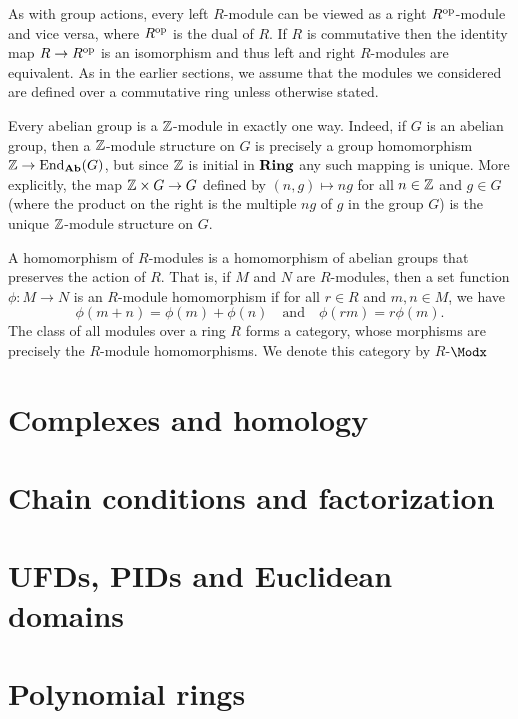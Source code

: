 As with group actions, every left \(R\)-module can be viewed as a right \(R^{\mathrm{op}}\)-module and vice versa, where \(R^{\mathrm{op}}\) is the dual of \(R\). If \(R\) is commutative then the identity map \(R \to R^{\mathrm{op}}\) is an isomorphism and thus left and right \(R\)-modules are equivalent. As in the earlier sections, we assume that the modules we considered are defined over a commutative ring unless otherwise stated.

\begin{example}
    Every abelian group is a \(\mathbb{Z}\)-module in exactly one way. Indeed, if \(G\) is an abelian group, then a \(\mathbb{Z}\)-module structure on \(G\) is precisely a group homomorphism \(\mathbb{Z} \to \operatorname{End}_{\mathbf{Ab}}(G)\), but since \(\mathbb{Z}\) is initial in \(\mathbf{Ring}\) any such mapping is unique. More explicitly, the map \(\mathbb{Z} \times G \to G\) defined by \((n, g) \mapsto ng\) for all \(n \in \mathbb{Z}\) and \(g \in G\) (where the product on the right is the multiple \(ng\) of \(g\) in the group \(G\)) is the unique \(\mathbb{Z}\)-module structure on \(G\).
\end{example}

A homomorphism of \(R\)-modules is a homomorphism of abelian groups that preserves the action of \(R\). That is, if \(M\) and \(N\) are \(R\)-modules, then a set function \(\phi: M \to N\) is an \(R\)-module homomorphism if for all \(r \in R\) and \(m, n \in M\), we have
\[
    \phi(m + n) = \phi(m) + \phi(n) \quad \text{and} \quad \phi(rm) = r\phi(m).
\]
The class of all modules over a ring \(R\) forms a category, whose morphisms are precisely the \(R\)-module homomorphisms. We denote this category by \(R\)-\(\Modx\)

\section{Complexes and homology}

\section{Chain conditions and factorization}

\section{UFDs, PIDs and Euclidean domains}

\section{Polynomial rings}
